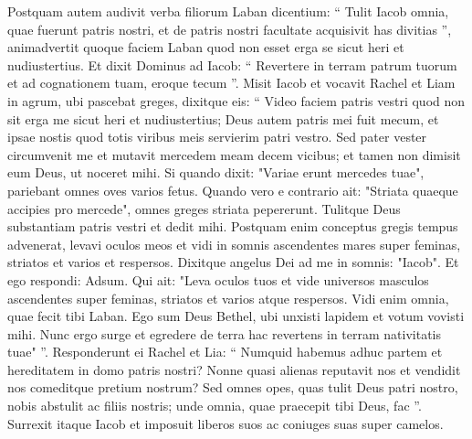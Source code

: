 \begin{biblechapter}
\begin{biblechapter}
\begin{biblechapter}
\begin{biblechapter}
\begin{biblechapter}
\begin{biblechapter}
\begin{biblechapter}
\begin{biblechapter}
\begin{biblechapter}
\begin{biblechapter}
\begin{biblechapter}
\begin{biblechapter}
\begin{biblechapter}
\begin{biblechapter}
\begin{biblechapter}
\begin{biblechapter}
\begin{biblechapter}
\begin{biblechapter}
\begin{biblechapter}
\begin{biblechapter}
\begin{biblechapter}
\begin{biblechapter}
\begin{biblechapter}
\begin{biblechapter}
\begin{biblechapter}
\begin{biblechapter}
\begin{biblechapter}
\begin{biblechapter}
\begin{biblechapter}
\begin{biblechapter}
\begin{biblechapter}
\verse Postquam autem audivit verba filiorum Laban dicentium: “ Tulit Iacob omnia, quae fuerunt patris nostri, et de patris nostri facultate acquisivit has divitias ”, 
\verse animadvertit quoque faciem Laban quod non esset erga se sicut heri et nudiustertius. 
\verse Et dixit Dominus ad Iacob: “ Revertere in terram patrum tuorum et ad cognationem tuam, eroque tecum ”.
 \verse Misit Iacob et vocavit Rachel et Liam in agrum, ubi pascebat greges, 
\verse dixitque eis: “ Video faciem patris vestri quod non sit erga me sicut heri et nudiustertius; Deus autem patris mei fuit mecum, 
\verse et ipsae nostis quod totis viribus meis servierim patri vestro. 
\verse Sed pater vester circumvenit me et mutavit mercedem meam decem vicibus; et tamen non dimisit eum Deus, ut noceret mihi. 
\verse Si quando dixit: "Variae erunt mercedes tuae", pariebant omnes oves varios fetus. Quando vero e contrario ait: "Striata quaeque accipies pro mercede", omnes greges striata pepererunt. 
\verse Tulitque Deus substantiam patris vestri et dedit mihi. 
\verse Postquam enim conceptus gregis tempus advenerat, levavi oculos meos et vidi in somnis ascendentes mares super feminas, striatos et varios et respersos.
 \verse Dixitque angelus Dei ad me in somnis: "Iacob". Et ego respondi: Adsum. 
\verse Qui ait: "Leva oculos tuos et vide universos masculos ascendentes super feminas, striatos et varios atque respersos. Vidi enim omnia, quae fecit tibi Laban. 
 \verse Ego sum Deus Bethel, ubi unxisti lapidem et votum vovisti mihi. Nunc ergo surge et egredere de terra hac revertens in terram nativitatis tuae" ”.
 \verse Responderunt ei Rachel et Lia: “ Numquid habemus adhuc partem et hereditatem in domo patris nostri? 
\verse Nonne quasi alienas reputavit nos et vendidit nos comeditque pretium nostrum? 
\verse Sed omnes opes, quas tulit Deus patri nostro, nobis abstulit ac filiis nostris; unde omnia, quae praecepit tibi Deus, fac ”.
 \verse Surrexit itaque Iacob et imposuit liberos suos ac coniuges suas super camelos. 

\end{biblechapter}
\end{biblechapter}
\end{biblechapter}
\end{biblechapter}
\end{biblechapter}
\end{biblechapter}
\end{biblechapter}
\end{biblechapter}
\end{biblechapter}
\end{biblechapter}
\end{biblechapter}
\end{biblechapter}
\end{biblechapter}
\end{biblechapter}
\end{biblechapter}
\end{biblechapter}
\end{biblechapter}
\end{biblechapter}
\end{biblechapter}
\end{biblechapter}
\end{biblechapter}
\end{biblechapter}
\end{biblechapter}
\end{biblechapter}
\end{biblechapter}
\end{biblechapter}
\end{biblechapter}
\end{biblechapter}
\end{biblechapter}
\end{biblechapter}
\end{biblechapter}
